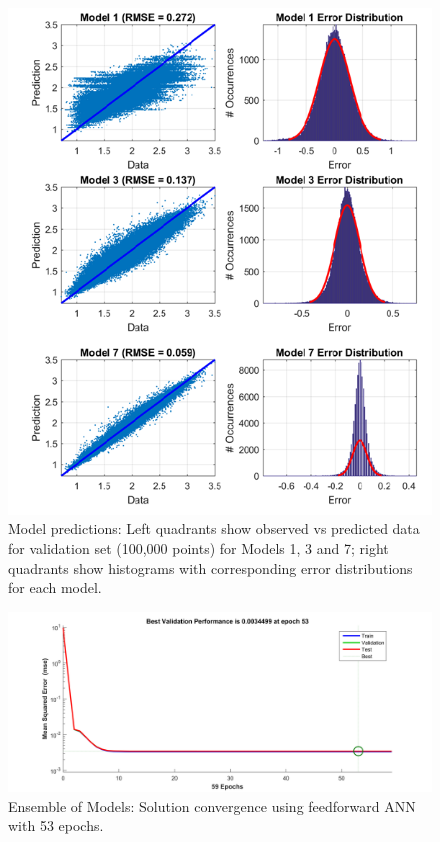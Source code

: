 \documentclass{article}
\begin{document}
 
\begin{figure}[!h]
\begin{center}
\includegraphics[scale=1.3]{Figure_1} %
\end{center}
\vspace*{-10mm} %
\caption{Model predictions: Left quadrants show observed vs predicted data for validation set (100,000 points) for Models 1, 3 and 7; right quadrants show histograms with corresponding error distributions for each model.}
\label{fig:MARS}
\end{figure}

\begin{figure}[!h]
\begin{center}
\includegraphics[scale=0.2]{Figure_2} %
\end{center}
\vspace*{-5mm} %
\caption{Ensemble of Models: Solution convergence using feedforward ANN with 53 epochs.}
\label{fig:Ensemble_of_Models}
\end{figure}
\end{document}
